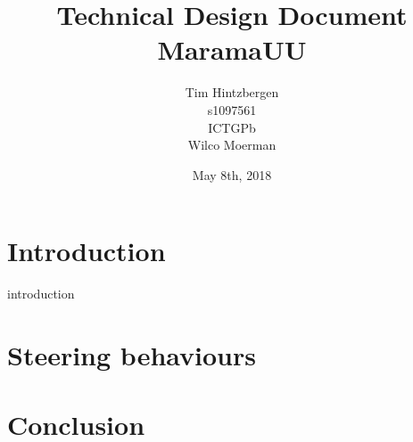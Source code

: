 \documentclass[10pt]{extarticle} %
\title{\huge Technical Design Document MaramaUU}
\author{Tim Hintzbergen	\\s1097561
								\\ICTGPb
								\\Wilco Moerman}
\date{May 8th, 2018}
\begin{document}
   \maketitle
   \thispagestyle{empty}
   \newpage
   \newpage
   \setcounter{page}{1}
   \section {Introduction}
   introduction
   \newpage

   \tableofcontents{}
   \newpage

   \section{Steering behaviours}
  
   \newpage
   
   \section {Conclusion}

   \newpage

% 
\end{document}
